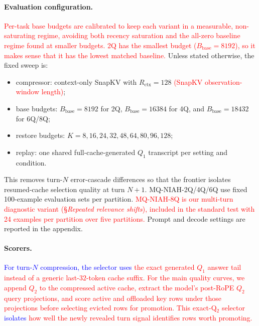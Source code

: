 \documentclass{article}
\newcommand{\bbase}{\ensuremath{B_{\mathrm{base}}}}
\begin{document}
\paragraph{Evaluation configuration.}
\textcolor{red}{Per-task base budgets are calibrated to keep each variant
in a measurable, non-saturating regime, avoiding both recency saturation
and the all-zero baseline regime found at smaller budgets. 2Q has the
smallest budget ($\bbase=8192$), so it makes sense that it has the
lowest matched baseline.}
Unless stated otherwise, the fixed sweep is:
\begin{itemize}[leftmargin=1.4em,noitemsep,topsep=2pt]
  \item compressor: context-only SnapKV with
  $R_{\mathrm{ctx}}=128$ \textcolor{red}{(SnapKV observation-window length)};
  \item base budgets: $\bbase=8192$ for 2Q, $\bbase=16384$ for 4Q, and
  $\bbase=18432$ for 6Q/8Q;
  \item restore budgets: $K=8,16,24,32,48,64,80,96,128$;
  \item replay: one shared full-cache-generated $Q_1$ transcript per
  setting and condition.
\end{itemize}
This removes turn-$N$ error-cascade differences so that the frontier
isolates resumed-cache selection quality at turn $N{+}1$.
MQ-NIAH-2Q/4Q/6Q use fixed 100-example evaluation sets per partition.
\textcolor{red}{MQ-NIAH-8Q is our multi-turn diagnostic variant
(\S\textit{Repeated relevance shifts}), included in the standard test
with 24 examples per partition over five partitions.}
Prompt and decode settings are reported in the appendix.

\paragraph{Scorers.}
\textcolor{red}{\textcolor{blue}{For turn-$N$ compression, the selector uses} the exact generated $Q_1$
answer tail instead of a generic last-$32$-token cache suffix.
For the main quality curves, we append $Q_2$ to the compressed active
cache, extract the model's post-RoPE $Q_2$ query projections, and score
active and offloaded key rows under those projections before selecting
evicted rows for promotion. This exact-Q$_2$ selector \textcolor{blue}{isolates}
how well the newly revealed turn signal identifies rows
worth promoting.}
\end{document}
